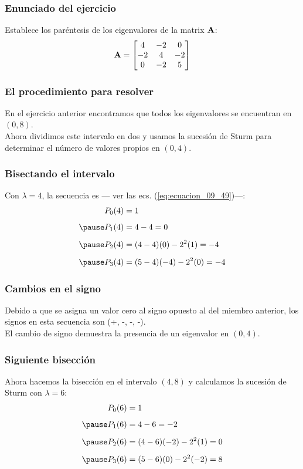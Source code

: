 \documentclass[12pt]{beamer}
\begin{document}
\begin{frame}
\frametitle{Enunciado del ejercicio}
Establece los paréntesis de los eigenvalores de la matrix $\vb{A}$:
\begin{align*}
\vb{A} = 
\begin{bmatrix}
4 & -2 & 0 \\
-2 & 4 & -2 \\
0 & -2 & 5
\end{bmatrix}
\end{align*}
\end{frame}
\begin{frame}
\frametitle{El procedimiento para resolver}
En el ejercicio anterior encontramos que todos los eigenvalores se encuentran en $(0, 8)$.
\\
\bigskip
\pause
Ahora dividimos este intervalo en dos y usamos la sucesión de Sturm para determinar el número de valores propios en $(0, 4)$.
\end{frame}
\begin{frame}
\frametitle{Bisectando el intervalo}
Con $\lambda = 4$, la secuencia es — ver las ecs. (\ref{eq:ecuacion_09_49})—:
\pause
\begin{eqnarray*}
\begin{aligned}
P_{0} (4) &= 1 \\[0.5em] \pause
P_{1} (4) &= 4 - 4 = 0 \\[0.5em] \pause
P_{2} (4) &= (4 - 4)(0) - 2^{2} (1) = -4 \\[0.5em] \pause
P_{3} (4) &= (5 - 4)(-4) - 2^{2} (0) = -4
\end{aligned}
\end{eqnarray*}
\end{frame}
\begin{frame}
\frametitle{Cambios en el signo}
Debido a que se asigna un valor cero al signo opuesto al del miembro anterior, \pause los signos en esta secuencia son (+, -, -, -).
\\
\bigskip
\pause
El cambio de signo demuestra la presencia de un eigenvalor en $(0, 4)$.
\end{frame}
\begin{frame}
\frametitle{Siguiente bisección}
Ahora hacemos la bisección en el intervalo $(4, 8)$ y calculamos la sucesión de Sturm con $\lambda = 6$:
\pause
\begin{eqnarray*}
\begin{aligned}
P_{0} (6) &= 1 \\[0.5em] \pause
P_{1} (6) &= 4 - 6 = -2 \\[0.5em] \pause
P_{2} (6) &= (4 - 6)(-2) - 2^{2} (1) = 0 \\[0.5em] \pause
P_{3} (6) &= (5 - 6)(0) - 2^{2} (-2) = 8
\end{aligned}
\end{eqnarray*}    
\end{frame}
\end{document}
